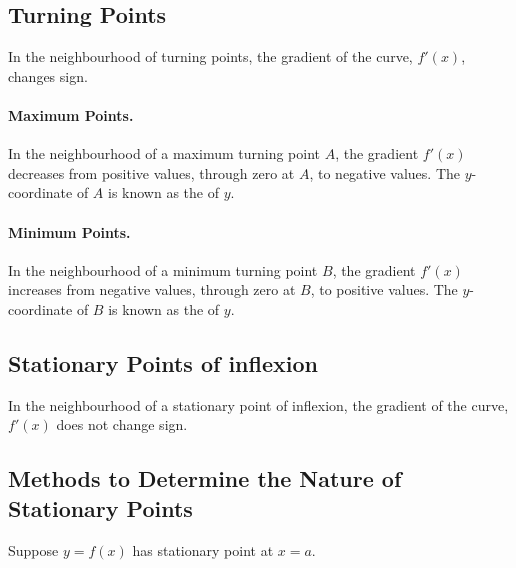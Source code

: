 \subsection{Turning Points} In the neighbourhood of turning points, the gradient of the curve, $f'(x)$, changes sign.

\paragraph{Maximum Points.} In the neighbourhood of a maximum turning point $A$, the gradient $f'(x)$ decreases from positive values, through zero at $A$, to negative values. The $y$-coordinate of $A$ is known as the  of $y$.

\paragraph{Minimum Points.} In the neighbourhood of a minimum turning point $B$, the gradient $f'(x)$ increases from negative values, through zero at $B$, to positive values. The $y$-coordinate of $B$ is known as the  of $y$.

\subsection{Stationary Points of inflexion}

In the neighbourhood of a stationary point of inflexion, the gradient of the curve, $f'(x)$ does not change sign.

\subsection{Methods to Determine the Nature of Stationary Points}

Suppose $y = f(x)$ has stationary point at $x = a$.

